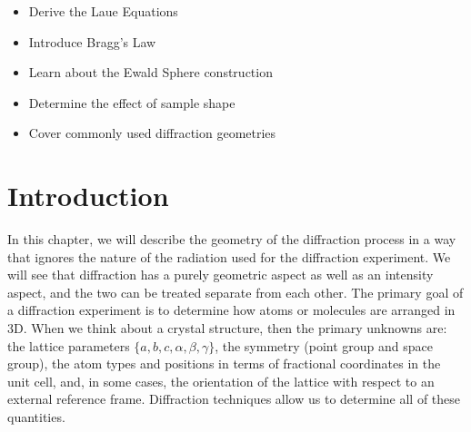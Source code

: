 \begin{learningobjectives}
{\begin{itemize}
    \item[{\color{OCBurntOrange}\ref{\chabbr:sec:LaueEq}:}] Derive the Laue Equations
    \item[{\color{OCBurntOrange}\ref{\chabbr:sec:BraggsLaw}:}] Introduce Bragg's Law
    \item[{\color{OCBurntOrange}\ref{\chabbr:sec:Ewald}:}] Learn about the Ewald Sphere construction
    \item[{\color{OCBurntOrange}\ref{\chabbr:sec:relaxedBragg}:}] Determine the effect of sample shape
    \item[{\color{OCBurntOrange}\ref{\chabbr:sec:DiffractionGeometries}:}] Cover commonly used diffraction geometries
\end{itemize}}
\end{learningobjectives}


% 
% 


\section{Introduction}\label{\chabbr:sec:introduction}

In this chapter, we will describe the geometry of the diffraction process in a way that ignores the nature of the radiation used for the diffraction experiment. We will see that diffraction has a purely geometric aspect as well as an intensity aspect, and the two can be treated separate from each other.  The primary goal of a diffraction experiment is to determine how atoms or molecules are arranged in 3D.  When we think about a crystal structure, then the primary unknowns are: the lattice parameters $\{a,b,c,\alpha,\beta,\gamma\}$, the symmetry (point group and space group), the atom types and positions in terms of fractional coordinates in the unit cell, and, in some cases, the orientation of the lattice with respect to an external reference frame.  Diffraction techniques allow us to determine all of these quantities.  

